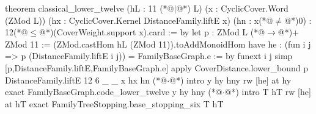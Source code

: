 theorem classical_lower_twelve (hL : 11 (*@$\mid$@*) L) (x : CyclicCover.Word (ZMod L))
    (hx : CyclicCover.Kernel DistanceFamily.liftE x) (hn : x(*@$\ne$@*)0) :
    12(*@$\le$@*)(CoverWeight.support x).card := by
  let p : ZMod L (*@$\to$@*)+ ZMod 11 := (ZMod.castHom hL (ZMod 11)).toAddMonoidHom
  have he : (fun i j => p (DistanceFamily.liftE i j)) = FamilyBaseGraph.e := by
    funext i j
    simp [p,DistanceFamily.liftE,FamilyBaseGraph.e]
  apply CoverDistance.lower_bound p DistanceFamily.liftE 12 6 _ _ x hx hn
  (*@$\cdot$@*) intro y hy hny
    rw [he] at hy
    exact FamilyBaseGraph.code_lower_twelve y hy hny
  (*@$\cdot$@*) intro T hT
    rw [he] at hT
    exact FamilyTreeStopping.base_stopping_six T hT
